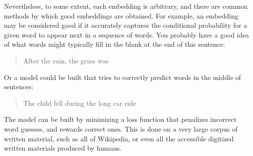 Nevertheless, to some extent, each embedding is arbitrary, and there are common methods by which good embeddings are obtained.  For example, an embedding may be considered good if it accurately captures the conditional probability for a given word to appear next in a sequence of words.  You probably have a good idea of what words might typically fill in the blank at the end of this sentence:
\begin{quote}
  After the rain, the grass was \underline{\hspace*{12ex}}
\end{quote}
Or a model could be built that tries to correctly predict words in the middle of sentences:
\begin{quote}
  The child fell \underline{\hspace*{12ex}} during the long car ride
\end{quote}
The model can be built by minimizing a loss function that penalizes incorrect word guesses, and rewards correct ones.  This is done on a very large corpus of written material, such as all of Wikipedia, or even all the accessible digitized written materials produced by humans.

